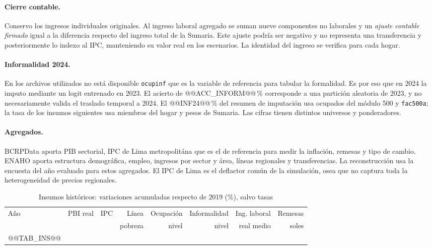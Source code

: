 \documentclass[11pt,a4paper]{article}
\begin{document}
\paragraph{Cierre contable.} Conservo los ingresos individuales originales. Al ingreso laboral agregado se suman nueve componentes no laborales y un \emph{ajuste contable firmado} igual a la diferencia respecto del ingreso total de la Sumaria. Este ajuste podría ser negativo y no representa una transferencia y posteriormente lo indexo al IPC, manteniendo su valor real en los escenarios. La identidad del ingreso se verifica para cada hogar.

\paragraph{Informalidad 2024.} En los archivos utilizados no está disponible \texttt{ocupinf} que es la variable de referencia para tabular la formalidad. Es por eso que en 2024 la imputo mediante un logit entrenado en 2023. El acierto de @@ACC_INFORM@@\,\% corresponde a una partición aleatoria de 2023, y no necesariamente valida el traslado temporal a 2024. El @@INF24@@\,\% del resumen de imputación usa ocupados del módulo 500 y \texttt{fac500a}; la tasa de los insumos siguientes usa miembros del hogar y pesos de Sumaria. Las cifras tienen distintos universos y ponderadores.

\paragraph{Agregados.} BCRPData aporta PIB sectorial, IPC de Lima metropolitána que es el de referencia para medir la inflación, remesas y tipo de cambio. ENAHO aporta estructura demográfica, empleo, ingresos por sector y área, líneas regionales y transferencias. La reconstrucción usa la encuesta del año evaluado para estos agregados. El IPC de Lima es el deflactor común de la simulación, osea que no captura toda la heterogeneidad de precios regionales.

\begin{table}[ht]\centering\footnotesize
\caption{Insumos históricos: variaciones acumuladas respecto de 2019 (\%), salvo tasas}
\begin{tabular}{lrrrrrrr}\toprule
Año & PBI real & IPC & Línea & Ocupación & Informalidad & Ing. laboral & Remesas\\
 & & & pobreza & nivel & nivel & real medio & soles\\\midrule
@@TAB_INS@@
\bottomrule\end{tabular}
\end{table}
\end{document}
